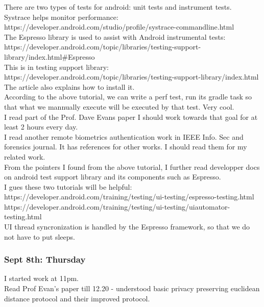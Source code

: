 \documentclass[11pt]{article}
\begin{document}
There are two types of tests for android: unit tests and instrument tests.\\

Systrace helps monitor performance: https://developer.android.com/studio/profile/systrace-commandline.html\\

The Espresso library is used to assist with Android instrumental tests: 
https://developer.android.com/topic/libraries/testing-support-library/index.html\#Espresso\\

This is in testing support library: https://developer.android.com/topic/libraries/testing-support-library/index.html\\
The article also explains how to install it.\\

According to the above tutorial, we can write a perf test, run its gradle task so that what we mannually execute will be executed by that test. Very 
cool.\\

I read part of the Prof. Dave Evans paper I should work towards that goal for at least 2 hours every day.\\
I read another remote biometrics authentication work in IEEE Info. Sec and forensics journal. It has references for other works. I should read them 
for my related work.\\

From the pointers I found from the above tutorial, I further read developper docs on android test support library and its components such as 
Espresso.\\
I gues these two tutorials will be helpful: \\
https://developer.android.com/training/testing/ui-testing/espresso-testing.html\\
https://developer.android.com/training/testing/ui-testing/uiautomator-testing.html\\

UI thread syncronization is handled by the Espresso framework, so that we do not have to put sleeps.\\

\subsubsection*{Sept 8th: Thursday}
I started work at 11pm. \\

Read Prof Evan's paper till 12.20 - understood basic privacy preserving euclidean distance protocol and their improved protocol.\\
\end{document}
